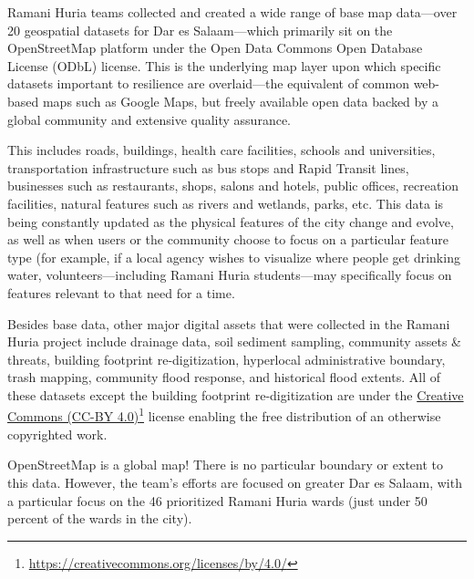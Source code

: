 \documentclass[a4paper,12pt,twoside]{article}
\begin{document}
\begin{multicols}{2}
Ramani Huria teams collected and created a wide range of base map data—over 20 geospatial datasets for Dar es Salaam—which primarily sit on the OpenStreetMap platform under the Open Data Commons Open Database License (ODbL) license. This is the underlying map layer upon which specific datasets important to resilience are overlaid—the equivalent of common web-based maps such as Google Maps, but freely available open data backed by a global community and extensive quality assurance.

This includes roads, buildings, health care facilities, schools and universities, transportation infrastructure such as bus stops and Rapid Transit lines, businesses such as restaurants, shops, salons and hotels, public offices, recreation facilities, natural features such as rivers and wetlands, parks, etc. This data is being constantly updated as the physical features of the city change and evolve, as well as when users or the community choose to focus on a particular feature type (for example, if a local agency wishes to visualize where people get drinking water, volunteers—including Ramani Huria students—may specifically focus on features relevant to that need for a time.

Besides base data, other major digital assets that were collected in the Ramani Huria project include drainage data, soil sediment sampling, community assets & threats, building footprint re-digitization, hyperlocal administrative boundary, trash mapping, community flood response, and historical flood extents. All of these datasets except the building footprint re-digitization are under the \href{https://creativecommons.org/licenses/by/4.0/}{Creative Commons (CC-BY 4.0)}\footnote{\url{https://creativecommons.org/licenses/by/4.0/}} license enabling the free distribution of an otherwise copyrighted work.

OpenStreetMap is a global map! There is no particular boundary or extent to this data. However, the team’s efforts are focused on greater Dar es Salaam, with a particular focus on the 46 prioritized Ramani Huria wards (just under 50 percent of the wards in the city).
\end{multicols}
\end{document}
